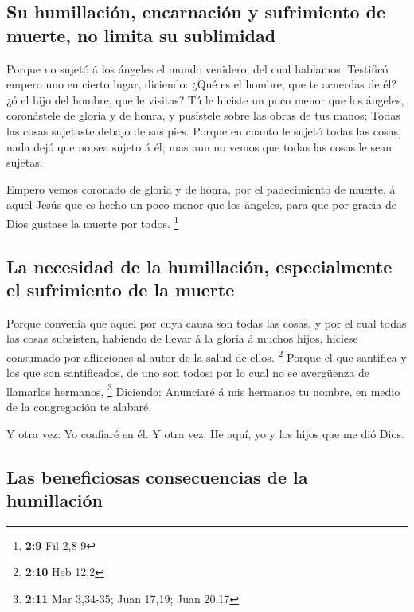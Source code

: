 \hypertarget{su-humillaciuxf3n-encarnaciuxf3n-y-sufrimiento-de-muerte-no-limita-su-sublimidad}{%
\subsection{Su humillación, encarnación y sufrimiento de muerte, no
limita su
sublimidad}\label{su-humillaciuxf3n-encarnaciuxf3n-y-sufrimiento-de-muerte-no-limita-su-sublimidad}}

 Porque no sujetó á los ángeles el mundo venidero, del
cual hablamos.  Testificó empero uno en cierto lugar,
diciendo: ¿Qué es el hombre, que te acuerdas de él? ¿ó el hijo del
hombre, que le visitas?  Tú le hiciste un poco menor que
los ángeles, coronástele de gloria y de honra, y pusístele sobre las
obras de tus manos;  Todas las cosas sujetaste debajo de
sus pies. Porque en cuanto le sujetó todas las cosas, nada dejó que no
sea sujeto á él; mas aun no vemos que todas las cosas le sean sujetas.

 Empero vemos coronado de gloria y de honra, por el
padecimiento de muerte, á aquel Jesús que es hecho un poco menor que los
ángeles, para que por gracia de Dios gustase la muerte por todos.
\footnote{\textbf{2:9} Fil 2,8-9}

\hypertarget{la-necesidad-de-la-humillaciuxf3n-especialmente-el-sufrimiento-de-la-muerte}{%
\subsection{La necesidad de la humillación, especialmente el sufrimiento
de la
muerte}\label{la-necesidad-de-la-humillaciuxf3n-especialmente-el-sufrimiento-de-la-muerte}}

 Porque convenía que aquel por cuya causa son todas las
cosas, y por el cual todas las cosas subsisten, habiendo de llevar á la
gloria á muchos hijos, hiciese consumado por aflicciones al autor de la
salud de ellos. \footnote{\textbf{2:10} Heb 12,2}  Porque
el que santifica y los que son santificados, de uno son todos: por lo
cual no se avergüenza de llamarlos hermanos, \footnote{\textbf{2:11} Mar
  3,34-35; Juan 17,19; Juan 20,17}  Diciendo: Anunciaré á
mis hermanos tu nombre, en medio de la congregación te alabaré.

 Y otra vez: Yo confiaré en él. Y otra vez: He aquí, yo y
los hijos que me dió Dios.

\hypertarget{las-beneficiosas-consecuencias-de-la-humillaciuxf3n}{%
\subsection{Las beneficiosas consecuencias de la
humillación}\label{las-beneficiosas-consecuencias-de-la-humillaciuxf3n}}

